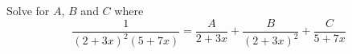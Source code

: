 Solve for $A$, $B$ and $C$ where
\[
\frac{1}{(2 + 3x)^2(5 + 7x)} 
= 
\frac{A}{2 + 3x} + \frac{B}{(2 + 3x)^2} + \frac{C}{5 + 7x}
\]
